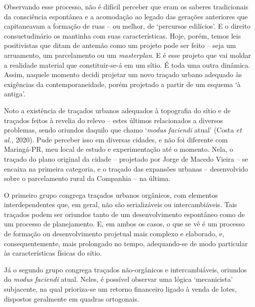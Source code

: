 \documentclass[12pt, a4paper]{book} %
\begin{document}
        Observando esse processo, não é difícil perceber que eram os saberes tradicionais da consciência espontânea e a acomodação ao legado das gerações anteriores que capitaneavam a formação de ruas – ou melhor, de `percursos edilícios'. E o direito consuetudinário os mantinha com suas características. Hoje, porém, temos leis positivistas que ditam de antemão como um projeto pode ser feito – seja um arruamento, um parcelamento ou um \textit{masterplan}. E é esse projeto que vai moldar a realidade material que constituir-se-á em um sítio. É toda uma outra dinâmica. Assim, naquele momento decidi projetar um novo traçado urbano adequado às exigências da contemporaneidade, porém projetado a partir de um esquema `à antiga'.



        Noto a existência de traçados urbanos adequados à topografia do sítio e de traçados feitos à revelia do relevo – estes últimos relacionados a diversos problemas, sendo oriundos daquilo que chamo `\textit{modus faciendi} atual' (Costa \textit{et al.,} 2020). Pude perceber isso em diversas cidades, e não foi diferente com Maringá-PR, meu local de estudo e experimentação até o momento. Nela, o traçado do plano original da cidade – projetado por Jorge de Macedo Vieira – se encaixa na primeira categoria, e o traçado das expansões urbanas – desenvolvido sobre o parcelamento rural da Companhia – na última.  


        O primeiro grupo congrega traçados urbanos orgânicos, com elementos interdependentes que, em geral, não são serializáveis ou intercambiáveis. Tais traçados podem ser oriundos tanto de um desenvolvimento espontâneo como de um processo de planejamento. E, em ambos os casos, o que se vê é um processo de formação ou desenvolvimento projetual mais complexo e elaborado, e, consequentemente, mais prolongado no tempo, adequando-se de modo particular às características físicas do sítio. 

        Já o segundo grupo congrega traçados não-orgânicos e intercambiáveis, oriundos do \textit{modus faciendi} atual. Neles, é possível observar uma lógica `mecanicista' subjacente, na qual prioriza-se um retorno financeiro ligado à venda de lotes, dispostos geralmente em quadras ortogonais.
\end{document}
